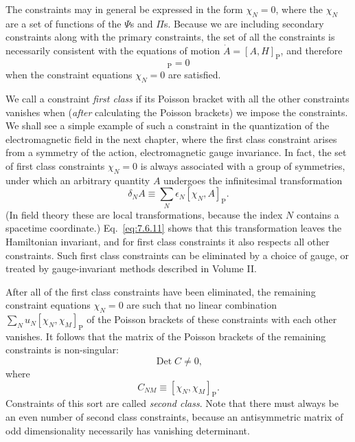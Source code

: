 The constraints may in general be expressed in the form $\chi_N=0$, where
the $\chi_N$ are a set of functions of the $\Psi$s and $\Pi$s. Because we are
including secondary constraints along with the primary constraints, the set
of all the constraints is necessarily consistent with the equations of
motion $\dot A=[A,H]_{\mathrm P}$, and therefore
\begin{equation}
[\chi_N,H]_{\mathrm P}=0
\tag{7.6.11}\label{eq:7.6.11}
\end{equation}
when the constraint equations $\chi_N=0$ are satisfied.

We call a constraint \emph{first class} if its Poisson bracket with all the
other constraints vanishes when (\emph{after} calculating the Poisson
brackets) we impose the constraints. We shall see a simple example of such a
constraint in the quantization of the electromagnetic field in the next
chapter, where the first class constraint arises from a symmetry of the
action, electromagnetic gauge invariance. In fact, the set of first class
constraints $\chi_N=0$ is always associated with a group of symmetries, under
which an arbitrary quantity $A$ undergoes the infinitesimal transformation
\begin{equation}
\delta_N A\equiv\sum_N\epsilon_N[\chi_N,A]_{\mathrm P}.
\tag{7.6.12}\label{eq:7.6.12}
\end{equation}
(In field theory these are local transformations, because the index $N$
contains a spacetime coordinate.) Eq.~\eqref{eq:7.6.11} shows that this transformation
leaves the Hamiltonian invariant, and for first class constraints it also
respects all other constraints. Such first class constraints can be
eliminated by a choice of gauge, or treated by gauge-invariant methods
described in Volume II.

After all of the first class constraints have been eliminated, the remaining
constraint equations $\chi_N=0$ are such that no linear combination
$\sum_Nu_N[\chi_N,\chi_M]_{\mathrm P}$ of the Poisson brackets of these
constraints with each other vanishes. It follows that the matrix of the
Poisson brackets of the remaining constraints is non-singular:
\begin{equation}
\operatorname{Det}C\ne0,
\tag{7.6.13}\label{eq:7.6.13}
\end{equation}
where
\begin{equation}
C_{NM}\equiv[\chi_N,\chi_M]_{\mathrm P}.
\tag{7.6.14}\label{eq:7.6.14}
\end{equation}
Constraints of this sort are called \emph{second class}. Note that there must
always be an even number of second class constraints, because an
antisymmetric matrix of odd dimensionality necessarily has vanishing
determinant.

